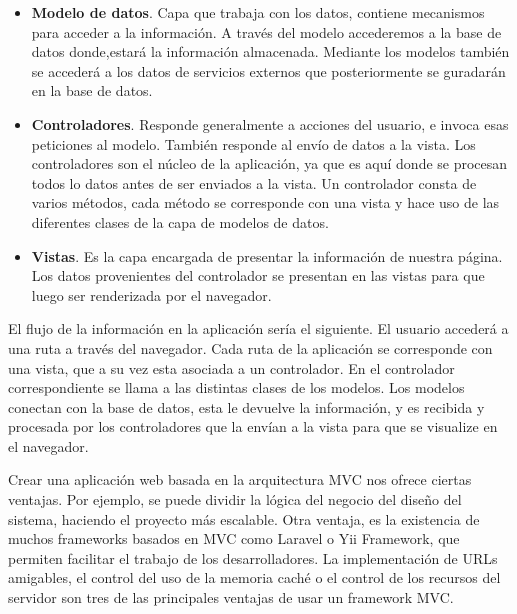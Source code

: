 \begin{itemize}

\item \textbf{Modelo de datos}. Capa que trabaja con los datos, contiene mecanismos para acceder a la información. A través del modelo accederemos a la base de datos donde,estará la información almacenada. Mediante los modelos también se accederá a los datos de servicios externos que posteriormente se guradarán en la base de datos.

\item \textbf{Controladores}. Responde generalmente a acciones del usuario, e invoca esas peticiones al modelo. También responde al envío de datos a la vista. Los controladores son el núcleo de la aplicación, ya que es aquí donde se procesan todos lo datos antes de ser enviados a la vista. Un controlador consta de varios métodos, cada método se corresponde con una vista y hace uso de las diferentes clases de la capa de modelos de datos.

\item \textbf{Vistas}. Es la capa encargada de presentar la información de nuestra página. Los datos provenientes del controlador se presentan en las vistas para que luego ser renderizada por el navegador.

\end{itemize}

 El flujo de la información en la aplicación sería el siguiente. El usuario accederá a una ruta a través del navegador. Cada ruta de la aplicación se corresponde con una vista, que a su vez esta asociada a un controlador. En el controlador correspondiente se llama a las distintas clases de los modelos. Los modelos conectan con la base de datos, esta le devuelve la información, y es recibida y procesada por los controladores que la envían a la vista para que se visualize en el navegador.


\vspace{5 mm}

Crear una aplicación web basada en la arquitectura MVC nos ofrece ciertas ventajas. Por ejemplo, se puede dividir la lógica del negocio del diseño del sistema, haciendo el proyecto más escalable. Otra ventaja, es la existencia  de muchos frameworks basados en MVC como Laravel o Yii Framework, que permiten facilitar el trabajo de los desarrolladores. La implementación de URLs amigables, el control del uso de la memoria caché o el control de los recursos del servidor son tres de las principales ventajas de usar un framework MVC.


